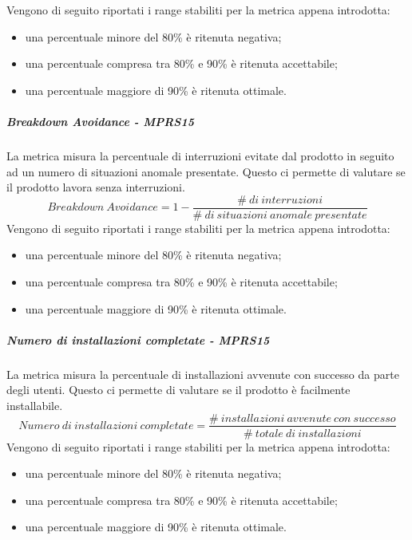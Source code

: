 \documentclass[../PianoDiQualifica.tex]{subfiles}
\begin{document}
			Vengono di seguito riportati i range stabiliti per la metrica appena introdotta:
			\begin{itemize}
				\item una percentuale minore del 80\% è ritenuta negativa;
				\item una percentuale compresa tra 80\% e 90\% è ritenuta accettabile;
				\item una percentuale maggiore di 90\% è ritenuta ottimale.
			\end{itemize}
			\subparagraph{Breakdown Avoidance - MPRS15}\label{MPRS15}
			La metrica misura la percentuale di interruzioni evitate dal prodotto in seguito ad un numero di situazioni anomale presentate. Questo ci permette di valutare se il prodotto lavora senza interruzioni. 
			\begin{equation}
			Breakdown \ Avoidance  =1 - \frac{\#\ di \ interruzioni}{\#\ di \ situazioni \ anomale \ presentate }
			\end{equation}
			Vengono di seguito riportati i range stabiliti per la metrica appena introdotta:
			\begin{itemize}
				\item una percentuale minore del 80\% è ritenuta negativa;
				\item una percentuale compresa tra 80\% e 90\% è ritenuta accettabile;
				\item una percentuale maggiore di 90\% è ritenuta ottimale.
			\end{itemize}
			\subparagraph{Numero di installazioni completate - MPRS15}\label{MPRS16}
			La metrica misura la percentuale di installazioni avvenute con successo da parte degli utenti. Questo ci permette di valutare se il prodotto è facilmente installabile. 
			\begin{equation}
			 Numero \ di \ installazioni \ completate = \frac{\#\ installazioni \ avvenute \ con \ successo}{\#\ totale \ di \ installazioni  }
			\end{equation}
			Vengono di seguito riportati i range stabiliti per la metrica appena introdotta:
			\begin{itemize}
				\item una percentuale minore del 80\% è ritenuta negativa;
				\item una percentuale compresa tra 80\% e 90\% è ritenuta accettabile;
				\item una percentuale maggiore di 90\% è ritenuta ottimale.
			\end{itemize}
\end{document}

